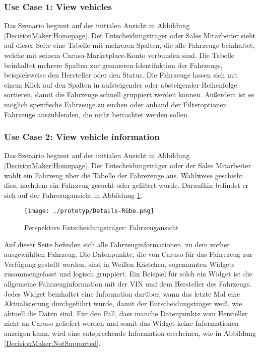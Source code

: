 \subsubsection{Use Case 1: View vehicles}
Das Szenario beginnt auf der initialen Ansicht in Abbildung \ref{DecisionMaker:Homepage}. Der Entscheidungsträger oder Sales Mitarbeiter sieht auf dieser Seite eine Tabelle mit mehreren Spalten, die alle Fahrzeuge beinhaltet, welche mit seinem Caruso-Marketplace-Konto verbunden sind. Die Tabelle beinhaltet mehrere Spalten zur genaueren Identifaktion der Fahrzeugs, beispielsweise den Hersteller oder den Status. Die Fahrzeuge lassen sich mit einem Klick auf den Spalten in aufsteigender oder absteigender Reihenfolge sortieren, damit die Fahrzeuge schnell gruppiert werden können. Außerdem ist es möglich spezifische Fahrzeuge zu suchen oder anhand der Filteroptionen Fahrzeuge auszublenden, die nicht betrachtet werden sollen.

\subsubsection{Use Case 2: View vehicle information}
Das Szenario beginnt auf der initialen Ansicht in Abbildung \ref{DecisionMaker:Homepage}. Der Entscheidungsträger oder der Sales Mitarbeiter wählt ein Fahrzeug über die Tabelle der Fahrezeuge aus. Wahlweise geschieht dies, nachdem ein Fahrzeug gesucht oder gefiltert wurde. Daraufhin befindet er sich auf der Fahrezugansicht in Abbildung \ref{DecisionMaker:DetailsRube}.

\begin{figure}[ht]
  \centering
  \texttt{[image: ./prototyp/Details-Rübe.png]}
  \caption{Perspektive Entscheidungsträger: Fahrzeugansicht}
  \label{DecisionMaker:DetailsRube}
\end{figure}

Auf dieser Seite befinden sich alle Fahrzeuginformationen, zu dem vorher ausgewählten Fahrzeug. Die Datenpunkte, die von Caruso für das Fahrezeug zur Verfügung gestellt werden, sind in Weißen Kästchen, sogenannten Widgets zusammengefasst und logisch gruppiert. Ein Beispiel für solch ein Widget ist die allgemeine Fahrzeuginformation mit der VIN und dem Hersteller des Fahrzeugs. Jedes Widget beinhaltet eine Information darüber, wann das letzte Mal eine Aktualisierung durchgeführt wurde, damit der Entscheidungsträger weiß, wie aktuell die Daten sind. Für den Fall, dass manche Datenpunkte vom Hersteller nicht an Caruso geliefert werden und somit das Widget keine Informationen anzeigen kann, wird eine entsprechende Information erscheinen, wie in Abbildung \ref{DecisionMaker:NotSupported}.


